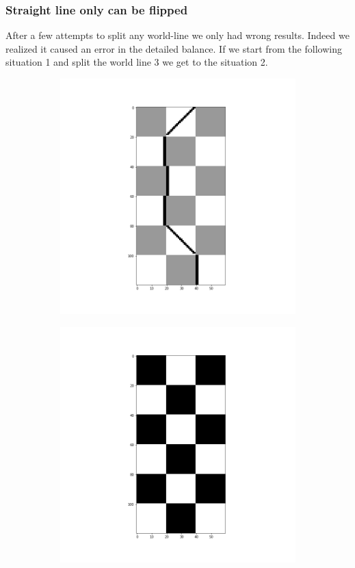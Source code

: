 \documentclass[a4paper,12pt]{article}
\begin{document}
		 
	 \subsubsection{Straight line only can be flipped}
	 After a few attempts to split any world-line we only had wrong results. Indeed we realized it caused an error in the detailed balance. If we start from the following situation 1 and split the world line 3 we get to the situation 2.
	 
	 \begin{figure}[H]
	 	\centering
	 	\begin{subfigure}[b]{0.3\textwidth}
	 		\includegraphics[scale=0.2]{situation1.png}
	 	\end{subfigure}
	 	\begin{subfigure}[b]{0.3\textwidth}
	 		\includegraphics[scale=0.2]{situation2.png}

\end{subfigure}
\end{figure}
\end{document}
